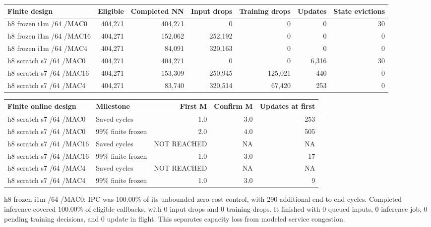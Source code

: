 \documentclass[10pt]{article}
\begin{document}
\begin{center}
\scriptsize
\begin{longtable}{lrrrrrr}
\toprule
Finite design & Eligible & Completed NN & Input drops & Training drops & Updates & State evictions \\
\midrule
\endhead
h8 frozen i1m /64 /MAC0 & 404,271 & 404,271 & 0 & 0 & 0 & 30 \\
h8 frozen i1m /64 /MAC16 & 404,271 & 152,062 & 252,192 & 0 & 0 & 0 \\
h8 frozen i1m /64 /MAC4 & 404,271 & 84,091 & 320,163 & 0 & 0 & 0 \\
h8 scratch s7 /64 /MAC0 & 404,271 & 404,271 & 0 & 0 & 6,316 & 30 \\
h8 scratch s7 /64 /MAC16 & 404,271 & 153,309 & 250,945 & 125,021 & 440 & 0 \\
h8 scratch s7 /64 /MAC4 & 404,271 & 83,740 & 320,514 & 67,420 & 253 & 0 \\
\bottomrule
\end{longtable}
\end{center}

\begin{center}
\scriptsize
\begin{longtable}{llrrr}
\toprule
Finite online design & Milestone & First M & Confirm M & Updates at first \\
\midrule
\endhead
h8 scratch s7 /64 /MAC0 & Saved cycles & 1.0 & 3.0 & 253 \\
h8 scratch s7 /64 /MAC0 & 99\% finite frozen & 2.0 & 4.0 & 505 \\
h8 scratch s7 /64 /MAC16 & Saved cycles & NOT REACHED & NA & NA \\
h8 scratch s7 /64 /MAC16 & 99\% finite frozen & 1.0 & 3.0 & 17 \\
h8 scratch s7 /64 /MAC4 & Saved cycles & NOT REACHED & NA & NA \\
h8 scratch s7 /64 /MAC4 & 99\% finite frozen & 1.0 & 3.0 & 9 \\
\bottomrule
\end{longtable}
\end{center}

h8 frozen i1m /64 /MAC0: IPC was 100.00\% of its unbounded zero-cost control, with 290 additional end-to-end cycles. Completed inference covered 100.00\% of eligible callbacks, with 0 input drops and 0 training drops. It finished with 0 queued inputs, 0 inference job, 0 pending training decisions, and 0 update in flight. This separates capacity loss from modeled service congestion.
\end{document}
